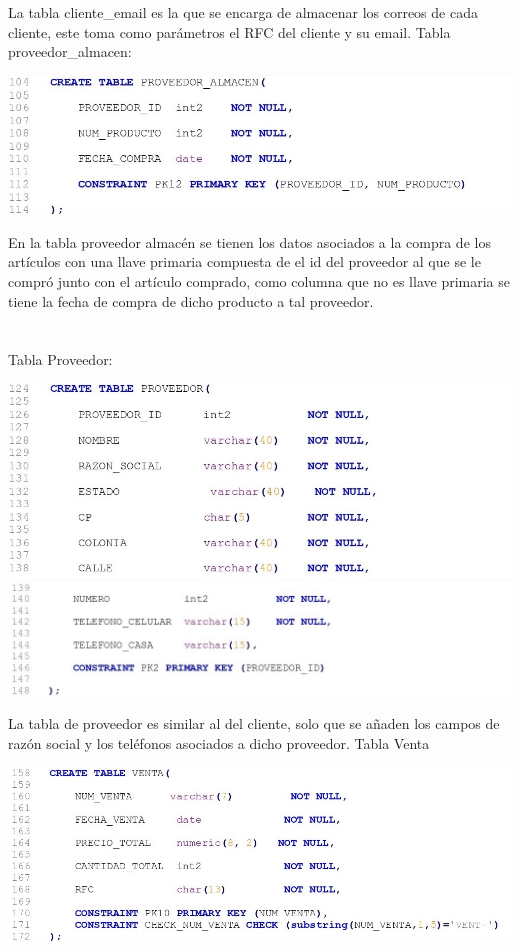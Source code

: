 \documentclass[letter,12pt]{article} %
\begin{document}
La tabla cliente\_email es la que se encarga de almacenar los correos de cada cliente, este toma como parámetros el RFC del cliente y su email.
\newpage
Tabla proveedor\_almacen:
\begin{center} 
\includegraphics[scale=0.90]{imagenes/DDL05.jpg}
\end{center}
En la tabla proveedor almacén se tienen los datos asociados a la compra de los artículos con una llave primaria compuesta de el id del proveedor al que se le compró junto con el artículo comprado, como columna que no es llave primaria se tiene la fecha de compra de dicho producto a tal proveedor.
\\\\\\
Tabla Proveedor:
\begin{center} 
\includegraphics[scale=0.90]{imagenes/DDL06-1.jpg}
\includegraphics[scale=0.90]{imagenes/DDL06-2.jpg}
\end{center}
La tabla de proveedor es similar al del cliente, solo que se añaden los campos de razón social y los teléfonos asociados a dicho proveedor.
\newpage
Tabla Venta
\begin{center} 
\includegraphics[scale=0.90]{imagenes/DDL07.jpg}
\end{center}
\end{document}
